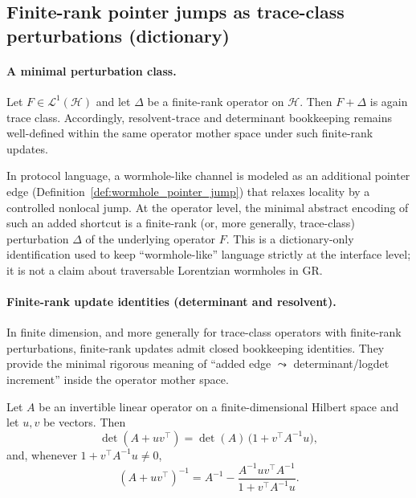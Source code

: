 

\subsection{Finite-rank pointer jumps as trace-class perturbations (dictionary)}
\label{subsec:operator_mother_space_pointer_jump}

\paragraph{A minimal perturbation class.}
\AuditTag Let $F\in\mathcal{L}^1(\mathcal{H})$ and let $\Delta$ be a finite-rank operator on $\mathcal{H}$.
Then $F+\Delta$ is again trace class.
Accordingly, resolvent-trace and determinant bookkeeping remains well-defined within the same operator mother space under such finite-rank updates.

\begin{remark}\label{rem:pointer_jump_finite_rank_dictionary}
\AuditTag In protocol language, a wormhole-like channel is modeled as an additional pointer edge (Definition~\ref{def:wormhole_pointer_jump}) that relaxes locality by a controlled nonlocal jump.
At the operator level, the minimal abstract encoding of such an added shortcut is a finite-rank (or, more generally, trace-class) perturbation $\Delta$ of the underlying operator $F$.
This is a dictionary-only identification used to keep ``wormhole-like'' language strictly at the interface level; it is not a claim about traversable Lorentzian wormholes in GR.
\end{remark}

\paragraph{Finite-rank update identities (determinant and resolvent).}
\MathTag In finite dimension, and more generally for trace-class operators with finite-rank perturbations, finite-rank updates admit closed bookkeeping identities.
They provide the minimal rigorous meaning of ``added edge $\leadsto$ determinant/logdet increment'' inside the operator mother space.

\begin{lemma}\label{lem:rank_one_det_sherman_morrison}
\MathTag Let $A$ be an invertible linear operator on a finite-dimensional Hilbert space and let $u,v$ be vectors.
Then
\[
\det(A+u v^\top)=\det(A)\,\bigl(1+v^\top A^{-1}u\bigr),
\]
and, whenever $1+v^\top A^{-1}u\neq 0$,
\[
(A+u v^\top)^{-1}=A^{-1}-\frac{A^{-1}u v^\top A^{-1}}{1+v^\top A^{-1}u}.
\]
\end{lemma}


